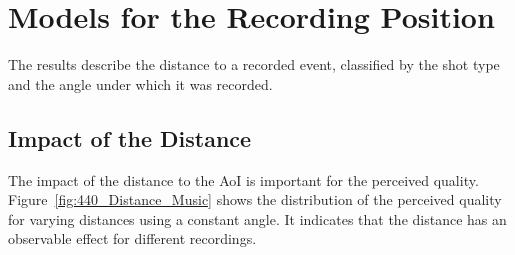 \section{Models for the Recording Position}
\label{sec:440_recording_position}
The results describe the distance to a recorded event, classified by the shot type and the angle under which it was recorded.
\subsection{Impact of the Distance}
The impact of the distance to the \ac{AoI} is important for the perceived quality. 
Figure~\ref{fig:440_Distance_Music} shows the distribution of the perceived quality for varying distances using a constant angle. 
It indicates that the distance has an observable effect for different recordings.
